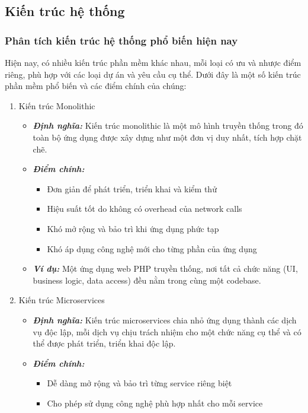 \subsection{Kiến trúc hệ thống}
\subsubsection{Phân tích kiến trúc hệ thống phổ biến hiện nay}
Hiện nay, có nhiều kiến trúc phần mềm khác nhau, mỗi loại có ưu và nhược điểm riêng, phù hợp với các loại dự án và yêu cầu cụ thể. Dưới đây là một số kiến trúc phần mềm phổ biến và các điểm chính của chúng:
\begin{enumerate}
    \item Kiến trúc Monolithic
    \begin{itemize}
        \item \textbf{\textit{Định nghĩa:}} Kiến trúc monolithic là một mô hình truyền thống trong đó toàn bộ ứng dụng được xây dựng như một đơn vị duy nhất, tích hợp chặt chẽ.
        \item \textbf{\textit{Điểm chính:}} 
        \begin{itemize}
            \item Đơn giản để phát triển, triển khai và kiểm thử
            \item Hiệu suất tốt do không có overhead của network calls
            \item Khó mở rộng và bảo trì khi ứng dụng phức tạp
            \item Khó áp dụng công nghệ mới cho từng phần của ứng dụng
        \end{itemize}
        \item \textbf{\textit{Ví dụ:}} Một ứng dụng web PHP truyền thống, nơi tất cả chức năng (UI, business logic, data access) đều nằm trong cùng một codebase.
    \end{itemize}
    \item Kiến trúc Microservices
    \begin{itemize}
        \item \textbf{\textit{Định nghĩa:}} Kiến trúc microservices chia nhỏ ứng dụng thành các dịch vụ độc lập, mỗi dịch vụ chịu trách nhiệm cho một chức năng cụ thể và có thể được phát triển, triển khai độc lập.
        \item \textbf{\textit{Điểm chính:}} 
        \begin{itemize}
            \item Dễ dàng mở rộng và bảo trì từng service riêng biệt
            \item Cho phép sử dụng công nghệ phù hợp nhất cho mỗi service

\end{itemize}
\end{itemize}
\end{enumerate}
